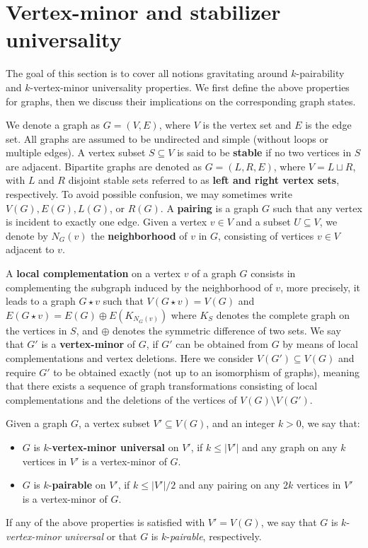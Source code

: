 \documentclass[a4paper,UKenglish,cleveref, autoref, thm-restate]{arxiv}
\newcommand{\ls}{\leqslant}
\begin{document}
\section{Vertex-minor and stabilizer universality}

The goal of this section is to cover all notions gravitating around  $k$-pairability and $k$-vertex-minor universality properties. We  first define the above properties for graphs,  then we  discuss their implications on the corresponding graph states. 

We denote a graph as $G = (V,E)$, where $V$ is the vertex set and $E$ is the edge set. All graphs are assumed to be undirected and simple (without loops or multiple edges). A vertex subset $S\subseteq V$ is said to be \textbf{stable} if no two vertices in $S$ are adjacent. Bipartite graphs are denoted as $G=(L, R, E)$, where $V = L \sqcup R$, with $L$ and $R$ disjoint stable sets referred to as \textbf{left and right vertex sets}, respectively.  To avoid possible confusion, we may sometimes write $V(G), E(G), L(G)$, or $R(G)$. A \textbf{pairing} is a graph $G$ such that any vertex is incident to exactly one edge. Given a vertex $v\in V$ and a subset $U\subseteq V$, we denote by $N_G(v)$ the \textbf{neighborhood} of $v$ in $G$, consisting of vertices $v\in V$ adjacent to $v$.

A \textbf{local complementation} on a vertex $v$ of a graph $G$ consists in complementing the subgraph induced by the neighborhood of $v$, more precisely, it leads to a graph $G\star v$ such that $V(G\star v)=V(G)$ and $E(G\star v) = E(G)\oplus E(K_{N_G(v)})$ where $K_S$ denotes the complete graph on the vertices in $S$, and $\oplus$ denotes the symmetric difference of two sets. We say that $G'$ is a \textbf{vertex-minor} of $G$, if $G'$ can be obtained from $G$ by means of local complementations and vertex deletions.  Here we consider $V(G') \subseteq V(G)$ and require $G'$ to be obtained exactly (not up to an isomorphism of graphs), meaning that there exists a sequence of graph transformations consisting of local complementations and the deletions of the vertices of $V(G)\setminus V(G')$.

\begin{definition} \label{def:kvmu-kpair}
    Given a graph $G$, a vertex subset  $V' \subseteq V(G)$, and an integer $k > 0$, we say that:
    \begin{itemize}
        \item $G$  is $k$-\textbf{vertex-minor universal} on $V'$, if $k\ls |V'|$ and any  graph on any $k$ vertices in $V'$ is a vertex-minor of $G$. 
        \item $G$ is $k$-\textbf{pairable} on $V'$, if $k\ls |V'|/2$ and any pairing on any $2k$ vertices in $V'$ is a vertex-minor of $G$.
    \end{itemize}


    If any of the above properties is satisfied with $V' = V(G)$, we say that $G$ is $k$-\emph{vertex-minor universal} or that $G$ is $k$-\emph{pairable}, respectively.
\end{definition}
\end{document}
